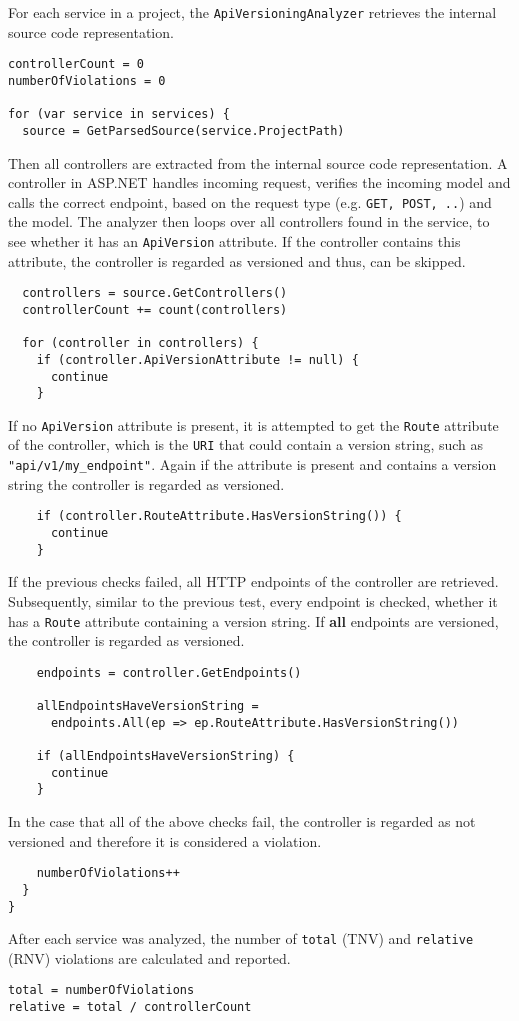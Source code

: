 \documentclass{article}
\begin{document}
For each service in a project, the \lstinline{ApiVersioningAnalyzer} retrieves the internal source code representation.
\begin{lstlisting}
controllerCount = 0
numberOfViolations = 0

for (var service in services) {
  source = GetParsedSource(service.ProjectPath)
\end{lstlisting}
Then all controllers are extracted from the internal source code representation. A controller in ASP.NET handles incoming request, verifies the incoming model and calls the correct endpoint, based on the request type (e.g. \lstinline{GET, POST, ..}) and the model. The analyzer then loops over all controllers found in the service, to see whether it has an \lstinline{ApiVersion} attribute. If the controller contains this attribute, the controller is regarded as versioned and thus, can be skipped.
\begin{lstlisting}
  controllers = source.GetControllers()
  controllerCount += count(controllers)

  for (controller in controllers) {
    if (controller.ApiVersionAttribute != null) {
      continue
    }
\end{lstlisting}
If no \lstinline{ApiVersion} attribute is present, it is attempted to get the \lstinline{Route} attribute of the controller, which is the \lstinline{URI} that could contain a version string, such as \lstinline{"api/v1/my_endpoint"}. Again if the attribute is present and contains a version string the controller is regarded as versioned.
\begin{lstlisting}
    if (controller.RouteAttribute.HasVersionString()) {
      continue
    }
\end{lstlisting}
If the previous checks failed, all HTTP endpoints of the controller are retrieved. Subsequently, similar to the previous test, every endpoint is checked, whether it has a \lstinline{Route} attribute containing a version string. If \textbf{all} endpoints are versioned, the controller is regarded as versioned.
\begin{lstlisting}
    endpoints = controller.GetEndpoints()
    
    allEndpointsHaveVersionString = 
      endpoints.All(ep => ep.RouteAttribute.HasVersionString())
      
    if (allEndpointsHaveVersionString) {
      continue
    }
\end{lstlisting}
In the case that all of the above checks fail, the controller is regarded as not versioned and therefore it is considered a violation.
\begin{lstlisting}
    numberOfViolations++
  }
}
\end{lstlisting}
After each service was analyzed, the number of \lstinline{total} (TNV) and \lstinline{relative} (RNV) violations are calculated and reported.
\begin{lstlisting}
total = numberOfViolations
relative = total / controllerCount
\end{lstlisting}
\end{document}
